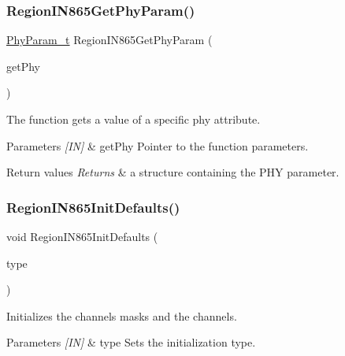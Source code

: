 \subsubsection{\texorpdfstring{Region\+I\+N865\+Get\+Phy\+Param()}{RegionIN865GetPhyParam()}}
{\footnotesize\ttfamily \hyperlink{group__REGION_gaed159b26e5c4677236b6e8677019db30}{Phy\+Param\+\_\+t} Region\+I\+N865\+Get\+Phy\+Param (\begin{DoxyParamCaption}\item[{\hyperlink{group__REGION_gab471483fff904f4f89bbc03f7fc380ab}{Get\+Phy\+Params\+\_\+t} $\ast$}]{get\+Phy }\end{DoxyParamCaption})}



The function gets a value of a specific phy attribute. 


\begin{DoxyParams}{Parameters}
{\em \mbox{[}\+I\+N\mbox{]}} & get\+Phy Pointer to the function parameters.\\
\hline
\end{DoxyParams}

\begin{DoxyRetVals}{Return values}
{\em Returns} & a structure containing the P\+HY parameter. \\
\hline
\end{DoxyRetVals}
\mbox{\label{group__REGIONIN865_ga06d37a72380911c81768c31a4f0b6da7}} 
\subsubsection{\texorpdfstring{Region\+I\+N865\+Init\+Defaults()}{RegionIN865InitDefaults()}}
{\footnotesize\ttfamily void Region\+I\+N865\+Init\+Defaults (\begin{DoxyParamCaption}\item[{\hyperlink{group__REGION_gaddc73ae10673ec925724e7870363bda9}{Init\+Type\+\_\+t}}]{type }\end{DoxyParamCaption})}



Initializes the channels masks and the channels. 


\begin{DoxyParams}{Parameters}
{\em \mbox{[}\+I\+N\mbox{]}} & type Sets the initialization type. \\
\hline
\end{DoxyParams}
\mbox{\label{group__REGIONIN865_ga97f6332c9583f63e5bbb00b123d80698}} 
